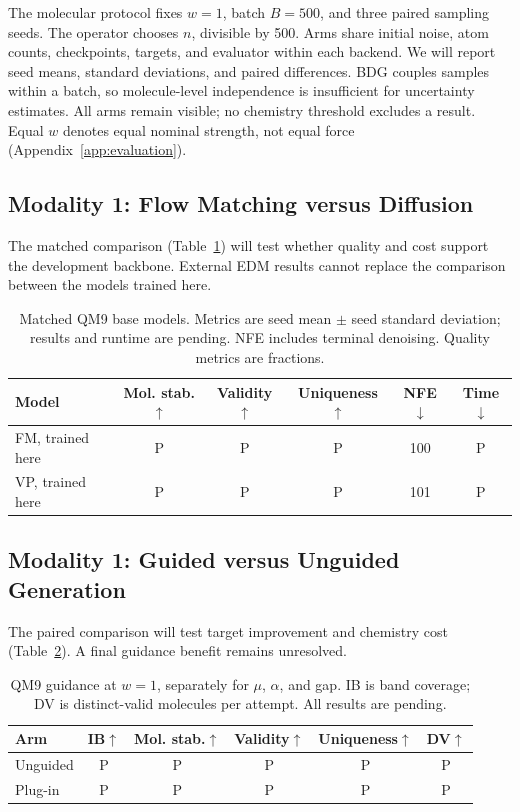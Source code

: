 \documentclass{article}
\newcommand{\pend}{\textcolor{black!60}{\textsf{P}}}
\begin{document}
The molecular protocol fixes $w=1$, batch $B=500$, and three paired sampling seeds. The operator chooses $n$, divisible by 500. Arms share initial noise, atom counts, checkpoints, targets, and evaluator within each backend. We will report seed means, standard deviations, and paired differences. BDG couples samples within a batch, so molecule-level independence is insufficient for uncertainty estimates. All arms remain visible; no chemistry threshold excludes a result. Equal $w$ denotes equal nominal strength, not equal force (Appendix~\ref{app:evaluation}).

\subsection{Modality 1: Flow Matching versus Diffusion}\label{sec:fmvd}
The matched comparison (Table~\ref{tab:fmvd}) will test whether quality and cost support the development backbone. External EDM results cannot replace the comparison between the models trained here.

\begin{table}[!htbp]
\centering\small
\caption{Matched QM9 base models. Metrics are seed mean $\pm$ seed standard deviation; results and runtime are pending. NFE includes terminal denoising. Quality metrics are fractions.}
\label{tab:fmvd}
\begin{tabular}{lccccc}
\toprule
Model & Mol. stab.$\uparrow$ & Validity$\uparrow$ & Uniqueness$\uparrow$ & NFE$\downarrow$ & Time$\downarrow$\\
\midrule
FM, trained here & \pend & \pend & \pend & 100 & \pend\\
VP, trained here & \pend & \pend & \pend & 101 & \pend\\
\bottomrule
\end{tabular}
\end{table}


\subsection{Modality 1: Guided versus Unguided Generation}\label{sec:guidworks}
The paired comparison will test target improvement and chemistry cost (Table~\ref{tab:guidance}). A final guidance benefit remains unresolved.

\begin{table}[!htbp]
\centering\small
\caption{QM9 guidance at $w=1$, separately for $\mu$, $\alpha$, and gap. IB is band coverage; DV is distinct-valid molecules per attempt. All results are pending.}
\label{tab:guidance}
\begin{tabular}{lccccc}
\toprule
Arm & IB$\uparrow$ & Mol. stab.$\uparrow$ & Validity$\uparrow$ & Uniqueness$\uparrow$ & DV$\uparrow$\\
\midrule
Unguided & \pend & \pend & \pend & \pend & \pend\\
Plug-in & \pend & \pend & \pend & \pend & \pend\\
\bottomrule
\end{tabular}
\end{table}
\end{document}
